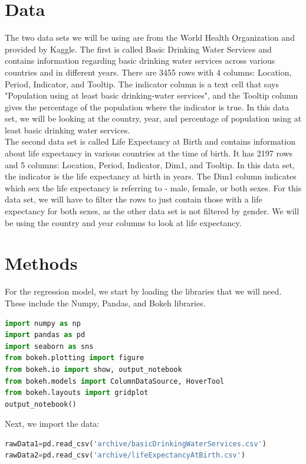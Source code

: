 \documentclass[12pt]{article}
\begin{document}
\section{Data}

The two data sets we will be using are from the World Health Organization and provided by Kaggle. The first is called Basic Drinking Water Services and contains information regarding basic drinking water services across various countries and in different years. There are 3455 rows with 4 columns: Location, Period, Indicator, and Tooltip. The indicator column is a text cell that says "Population using at least basic drinking-water services", and the Tooltip column gives the percentage of the population where the indicator is true. In this data set, we will be looking at the country, year, and percentage of population using at least basic drinking water services. \\
  
The second data set is called Life Expectancy at Birth and contains information about life expectancy in various countries at the time of birth. It has 2197 rows and 5 columns: Location, Period, Indicator, Dim1, and Tooltip. In this data set, the indicator is the life expectancy at birth in years. The Dim1 column indicates which sex the life expectancy is referring to - male, female, or both sexes. For this data set, we will have to filter the rows to just contain those with a life expectancy for both sexes, as the other data set is not filtered by gender. We will be using the country and year columns to look at life expectancy.


\section{Methods}

For the regression model, we start by loading the libraries that we will need. These include the Numpy, Pandas, and Bokeh libraries.

\begin{adjustwidth}{0.5in}{0.25in}
\begin{lstlisting}[language=Python]
import numpy as np
import pandas as pd
import seaborn as sns
from bokeh.plotting import figure
from bokeh.io import show, output_notebook
from bokeh.models import ColumnDataSource, HoverTool
from bokeh.layouts import gridplot
output_notebook()
\end{lstlisting}
\end{adjustwidth}

Next, we import the data:
\begin{adjustwidth}{0.5in}{0.25in}
\begin{lstlisting}[language=Python]
rawData1=pd.read_csv('archive/basicDrinkingWaterServices.csv')
rawData2=pd.read_csv('archive/lifeExpectancyAtBirth.csv')
\end{lstlisting}
\end{adjustwidth}
\end{document}
